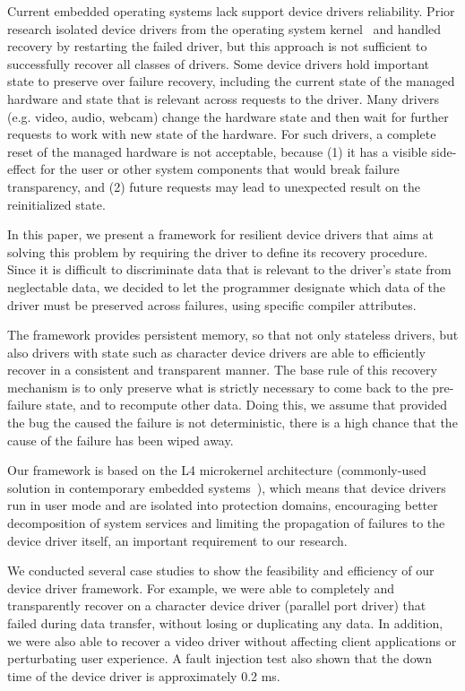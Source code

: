 \documentclass[times, 10pt, twocolumn]{article}
\begin{document}
Current embedded operating systems lack support device drivers reliability.  Prior research isolated device drivers from the operating system kernel~\cite{Herder2007,Swift2003} and handled recovery by restarting the failed driver, but this approach is not sufficient to successfully recover all classes of drivers.  Some device drivers hold important state to preserve over failure recovery,  including the current state of the managed hardware and state that is relevant across requests to the driver.  Many drivers (e.g. video, audio, webcam) change the hardware state and then wait for further requests to work with new state of the hardware.  For such drivers, a complete reset of the managed hardware is not acceptable, because (1) it has a visible side-effect for the user or other system components that would break failure transparency, and (2) future requests may lead to unexpected result on the reinitialized state.

In this paper, we present a framework for resilient device drivers that aims at solving this problem by requiring the driver to define its recovery procedure.  Since it is difficult to discriminate data that is relevant to the driver's state from neglectable data, we decided to let the programmer designate which data of the driver must be preserved across failures, using specific compiler attributes.

The framework provides persistent memory, so that not only stateless drivers, but also drivers with state such as character device drivers are able to efficiently recover in a consistent and transparent manner.  The base rule of this recovery mechanism is to only preserve what is strictly necessary to come back to the pre-failure state, and to recompute other data. Doing this, we assume that provided the bug the caused the failure is not deterministic, there is a high chance that the cause of the failure has been wiped away.

Our framework is based on the L4 microkernel architecture (commonly-used solution in contemporary embedded systems~\cite{Heiser2007}), which means that device drivers run in user mode and are isolated into protection domains, encouraging better decomposition of system services and limiting the propagation of failures to the device driver itself, an important requirement to our research.

We conducted several case studies to show the feasibility and efficiency of our device driver framework. For example, we were able to completely and transparently recover on a character device driver (parallel port driver) that failed during data transfer, without losing or duplicating any data. In addition, we were also able to recover a video driver without affecting client applications or perturbating user experience.  A fault injection test also shown that the down time of the device driver is approximately 0.2 ms.
\end{document}
